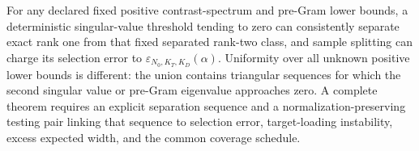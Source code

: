 For any declared fixed positive contrast-spectrum and pre-Gram lower bounds, a deterministic singular-value threshold tending to zero can consistently separate exact rank one from that fixed separated rank-two class, and sample splitting can charge its selection error to \(\varepsilon_{N_0,K_T,K_D}(\alpha)\). Uniformity over all unknown positive lower bounds is different: the union contains triangular sequences for which the second singular value or pre-Gram eigenvalue approaches zero. A complete theorem requires an explicit separation sequence and a normalization-preserving testing pair linking that sequence to selection error, target-loading instability, excess expected width, and the common coverage schedule.
